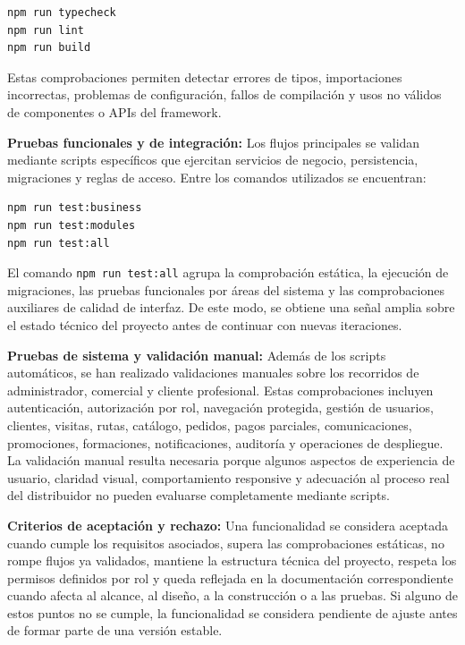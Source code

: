 \begin{lstlisting}[language=bash]
npm run typecheck
npm run lint
npm run build
\end{lstlisting}

Estas comprobaciones permiten detectar errores de tipos, importaciones incorrectas, problemas de configuración, fallos de compilación y usos no válidos de componentes o APIs del framework.

\textbf{Pruebas funcionales y de integración:} Los flujos principales se validan mediante scripts específicos que ejercitan servicios de negocio, persistencia, migraciones y reglas de acceso. Entre los comandos utilizados se encuentran:

\begin{lstlisting}[language=bash]
npm run test:business
npm run test:modules
npm run test:all
\end{lstlisting}

El comando \texttt{npm run test:all} agrupa la comprobación estática, la ejecución de migraciones, las pruebas funcionales por áreas del sistema y las comprobaciones auxiliares de calidad de interfaz. De este modo, se obtiene una señal amplia sobre el estado técnico del proyecto antes de continuar con nuevas iteraciones.

\textbf{Pruebas de sistema y validación manual:} Además de los scripts automáticos, se han realizado validaciones manuales sobre los recorridos de administrador, comercial y cliente profesional. Estas comprobaciones incluyen autenticación, autorización por rol, navegación protegida, gestión de usuarios, clientes, visitas, rutas, catálogo, pedidos, pagos parciales, comunicaciones, promociones, formaciones, notificaciones, auditoría y operaciones de despliegue. La validación manual resulta necesaria porque algunos aspectos de experiencia de usuario, claridad visual, comportamiento responsive y adecuación al proceso real del distribuidor no pueden evaluarse completamente mediante scripts.

\textbf{Criterios de aceptación y rechazo:} Una funcionalidad se considera aceptada cuando cumple los requisitos asociados, supera las comprobaciones estáticas, no rompe flujos ya validados, mantiene la estructura técnica del proyecto, respeta los permisos definidos por rol y queda reflejada en la documentación correspondiente cuando afecta al alcance, al diseño, a la construcción o a las pruebas. Si alguno de estos puntos no se cumple, la funcionalidad se considera pendiente de ajuste antes de formar parte de una versión estable.

